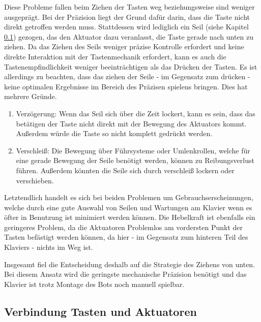Diese Probleme fallen beim Ziehen der Tasten weg beziehungsweise sind weniger ausgeprägt. %
Bei der Präzision liegt der Grund dafür darin, dass die Taste nicht
direkt getroffen werden muss. Stattdessen wird lediglich ein Seil (siehe Kapitel \ref{subsec:VerbindungTastenAktuatoren})
gezogen, das den Aktuator dazu veranlasst, die Taste
gerade nach unten zu ziehen.
Da das Ziehen des Seils weniger präzise Kontrolle erfordert
und keine direkte Interaktion mit der Tastenmechanik erfordert, kann es auch die Tastenempfindlichkeit weniger beeinträchtigen
als das Drücken der Tasten. Es ist allerdings zu beachten, dass das ziehen der Seile - im Gegensatz zum drücken - keine
optimalen Ergebnisse im Bereich des Präzisen spielens bringen. Dies hat mehrere Gründe.
\begin{enumerate}
	\item Verzögerung: Wenn das Seil sich über die Zeit lockert, kann es sein, dass das betätigen der Taste nicht direkt mit der Bewegung des Aktuators kommt. Außerdem würde die Taste so nicht komplett gedrückt werden.
	\item Verschleiß: Die Bewegung über Führsysteme oder Umlenkrollen, welche für eine gerade Bewegung der Seile benötigt werden, können zu Reibungsverlust führen. Außerdem könnten die Seile sich durch verschleiß lockern oder verschieben.
\end{enumerate}
Letztendlich handelt es sich bei beiden Problemen um Gebrauchserscheinungen, welche durch eine gute Auswahl von Seilen
und Wartungen am Klavier wenn es öfter in Benutzung ist minimiert werden können.
Die Hebelkraft ist ebenfalls ein geringeres Problem, da die Aktuatoren Problemlos am vordersten Punkt der Tasten
befästigt werden können, da hier - im Gegensatz zum hinteren Teil des Klaviers - nichts im Weg ist.

Insgesamt fiel die Entscheidung deshalb auf die Strategie des Ziehens von unten.
Bei diesem Ansatz wird die geringste mechanische Präzision benötigt und das Klavier ist trotz Montage des Bots noch manuell spielbar.


\subsection{Verbindung Tasten und Aktuatoren} \label{subsec:VerbindungTastenAktuatoren}


